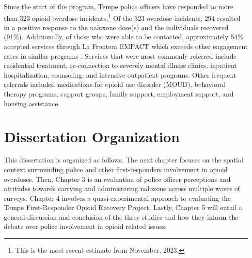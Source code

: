 Since the start of the program, Tempe police officers have responded to more than 323 opioid overdose incidents.\footnote{This is the most recent estimate from November, 2023.} Of the 323 overdose incidents, 294 resulted in a positive response to the naloxone dose(s) and the individuals recovered (91\%). Additionally, of those who were able to be contacted, approximately 54\% accepted services through La Frontera EMPACT which exceeds other engagement rates in similar programs \parencite{dahlem_beyond_2017, wagner_training_2016}. Services that were most commonly referred include residential treatment, re-connection to severely mental illness clinics, inpatient hospitalization, counseling, and intensive outpatient programs. Other frequent referrals included medications for opioid use disorder (MOUD), behavioral therapy programs, support groups, family support, employment support, and housing assistance.

\section{Dissertation Organization}

This dissertation is organized as follows. The next chapter focuses on the spatial context surrounding police and other first-responders involvement in opioid overdoses. Then, Chapter 3 is an evaluation of police officer perceptions and attitudes towards carrying and administering naloxone across multiple waves of surveys. Chapter 4 involves a quasi-experimental approach to evaluating the Tempe First-Responder Opioid Recovery Project. Lastly, Chapter 5 will entail a general discussion and conclusion of the three studies and how they inform the debate over police involvement in opioid related issues.
